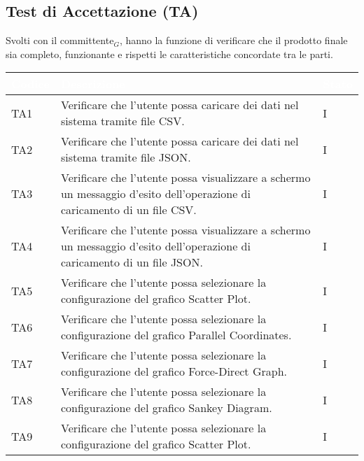     \subsection{Test di Accettazione (TA)} Svolti con il committente$_G$, hanno la funzione di verificare che il prodotto
        finale sia completo, funzionante e rispetti le caratteristiche concordate tra le parti.
        \begin{center}
            \renewcommand\arraystretch{1.5}
            \centering
            \begin{longtable}{|p{1.5cm}|p{11cm}|p{1cm}|}
            \hline
            \rowcolor[HTML]{036400}
            \textcolor{white}{\textbf{Codice}} & \textcolor{white}{\textbf{Descrizione}} & \textcolor{white}{\textbf{Stato}} \\ \hline
                \rowcolor[HTML]{EFEFEF}
                TA1 & Verificare che l’utente possa caricare dei dati nel sistema tramite file CSV. & I\\ \hline
                \rowcolor[HTML]{C0C0C0}
                TA2 & Verificare che l’utente possa caricare dei dati nel sistema tramite file JSON. & I\\ \hline
                \rowcolor[HTML]{EFEFEF}
                TA3 & Verificare che l’utente possa visualizzare a schermo un messaggio d’esito dell’operazione di caricamento di un file CSV.& I\\ \hline
                \rowcolor[HTML]{C0C0C0}
                TA4 & Verificare che l’utente possa visualizzare a schermo un messaggio d’esito dell’operazione di caricamento di un file JSON.& I\\ \hline
                \rowcolor[HTML]{EFEFEF}
                TA5 & Verificare che l’utente possa selezionare la configurazione del grafico Scatter Plot. & I\\ \hline
                \rowcolor[HTML]{C0C0C0}
                TA6 & Verificare che l’utente possa selezionare la configurazione del grafico Parallel Coordinates. & I\\ \hline
                \rowcolor[HTML]{EFEFEF}
                TA7 & Verificare che l’utente possa selezionare la configurazione del grafico Force-Direct Graph. & I\\ \hline
                \rowcolor[HTML]{C0C0C0}
                TA8 & Verificare che l’utente possa selezionare la configurazione del grafico Sankey Diagram. & I\\ \hline
                \rowcolor[HTML]{EFEFEF}
                TA9 & Verificare che l’utente possa selezionare la configurazione del grafico Scatter Plot. & I\\ \hline

\end{longtable}
\end{center}
